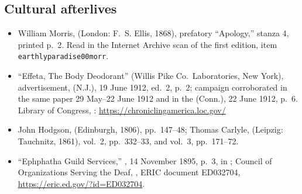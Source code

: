 \subsection*{Cultural afterlives}

\begin{itemize}[leftmargin=1.2em, itemsep=0.15em]
\item William Morris,  (London: F.~S. Ellis,
1868), prefatory ``Apology,'' stanza 4, printed p.~2. Read in the Internet
Archive scan of the first edition, item \texttt{earthlyparadise00morr}.
\item ``Effeta, The Body Deodorant'' (Willis Pike Co.\ Laboratories, New York),
advertisement,  (N.J.), 19 June 1912, ed.~2,
p.~2; campaign corroborated in the same paper 29 May--22 June 1912 and in the
 (Conn.), 22 June 1912, p.~6. Library of Congress,
: \url{https://chroniclingamerica.loc.gov/}
\item John Hodgson,  (Edinburgh, 1806), pp.\ 147--48; Thomas
Carlyle,  (Leipzig: Tauchnitz,
1861), vol.~2, pp.\ 332--33, and vol.~3, pp.\ 171--72.
\item ``Ephphatha Guild Services,'' , 14 November
1895, p.~3, in ; Council of Organizations Serving the
Deaf, , ERIC document ED032704,
\url{https://eric.ed.gov/?id=ED032704}.
\end{itemize}
